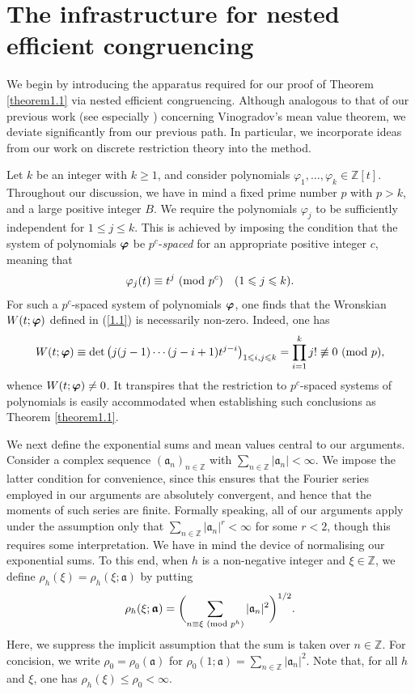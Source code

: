 \documentclass[12pt,reqno]{amsart}
\theoremstyle{definition}
\theoremstyle{remark}
\numberwithin{equation}{section}
\newcommand{\mmod}[1]{\,\,(\text{\rm mod}\,\,#1)}
\def\dbZ{{\mathbb Z}}\def\dbQ{{\mathbb Q}}
\def\gra{{\mathfrak a}}\def\grA{{\mathfrak A}}\def\bfgra{{\boldsymbol \gra}}
\def\le{\leqslant} \def\ge{\geqslant} \def\pleq{\preccurlyeq} \def\ple{\prec}
\begin{document}
\section{The infrastructure for nested efficient congruencing} We begin by introducing the 
apparatus required for our proof of Theorem \ref{theorem1.1} via nested efficient 
congruencing. Although analogous to that of our previous work (see especially 
\cite{Woo2012, Woo2015, Woo2016, Woo2017}) concerning Vinogradov's mean value 
theorem, we deviate significantly from our previous path. In particular, we incorporate ideas 
from our work on discrete restriction theory \cite{Woo2017a} into the method.\par

Let $k$ be an integer with $k\ge 1$, and consider polynomials $\varphi_1,\ldots ,\varphi_k
\in \dbZ[t]$. Throughout our discussion, we have in mind a fixed prime number $p$ with 
$p>k$, and a large positive integer $B$. We require the polynomials $\varphi_j$ to be 
sufficiently independent for $1\le j\le k$. This is achieved by imposing the condition that the 
system of polynomials ${\boldsymbol \varphi}$ be $p^c$-{\it spaced} for an appropriate positive integer 
$c$, meaning that
\begin{equation}\label{3.1}
\varphi_j(t)\equiv t^j\mmod{p^c}\quad (1\le j\le k).
\end{equation}
For such a $p^c$-spaced system of polynomials ${\boldsymbol \varphi}$, one finds that the Wronskian 
$W(t;{\boldsymbol \varphi})$ defined in (\ref{1.1}) is necessarily non-zero. Indeed, one has
$$W(t;\bfvarphi)\equiv \det 
\left( j(j-1)\cdots (j-i+1) t^{j-i}\right)_{1\le i,j\le k}=\prod_{i=1}^kj!
\not\equiv 0\mmod{p},$$
whence $W(t;{\boldsymbol \varphi})\ne 0$. It transpires that the restriction to $p^c$-spaced systems 
of polynomials is easily accommodated when establishing such conclusions as Theorem 
\ref{theorem1.1}.\par

We next define the exponential sums and mean values central to our arguments. Consider 
a complex sequence $(\gra_n)_{n\in \dbZ}$ with $\sum_{n\in \dbZ}|\gra_n|<\infty$. We 
impose the latter condition for convenience, since this ensures that the Fourier series 
employed in our arguments are absolutely convergent, and hence that the moments of such 
series are finite. Formally speaking, all of our arguments apply under the assumption only 
that $\sum_{n\in \dbZ}|\gra_n|^r<\infty$ for some $r<2$, though this requires some 
interpretation. We have in mind the device of normalising our exponential sums. To this end, 
when $h$ is a non-negative integer and $\xi\in \dbZ$, we define 
$\rho_h(\xi)=\rho_h(\xi;\bfgra)$ by putting
\begin{equation}\label{3.2}
\rho_h(\xi;\bfgra)=\biggl( \sum_{n\equiv \xi\mmod{p^h}}|\gra_n|^2\biggr)^{1/2}.
\end{equation}
Here, we suppress the implicit assumption that the sum is taken over $n\in \dbZ$. For 
concision, we write $\rho_0=\rho_0(\bfgra)$ for 
$\rho_0(1;\bfgra)=\sum_{n\in \dbZ}|\gra_n|^2$. Note that, for all $h$ and $\xi$, one has 
$\rho_h(\xi)\le \rho_0<\infty$.\par
\end{document}
